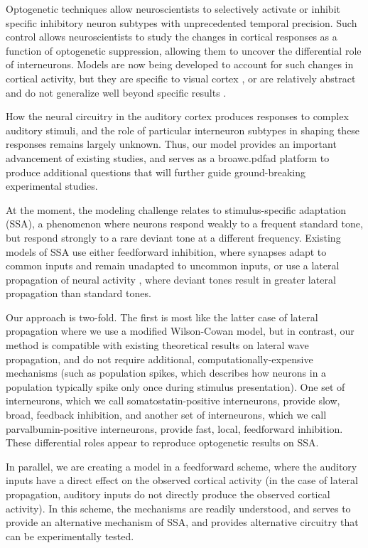 \documentclass[a4paper,11pt]{article}
\begin{document}
Optogenetic techniques allow neuroscientists to selectively activate or inhibit specific inhibitory neuron subtypes with unprecedented temporal precision. Such control allows neuroscientists to study the changes in cortical responses as a function of optogenetic suppression, allowing them to uncover the differential role of interneurons. Models are now being developed to account for such changes in cortical activity, but they are specific to visual cortex \cite{litwin2016inhibitory}, or are relatively abstract and do not generalize well beyond specific results \cite{seybold2015inhibitory,phillips2016asymmetric,phillips2017cortical}.

How the neural circuitry in the auditory cortex produces responses to complex auditory stimuli, and the role of particular interneuron subtypes in shaping these responses remains largely unknown. Thus, our model provides an important advancement of existing studies, and serves as a broawc.pdfad platform to produce additional questions that will further guide ground-breaking experimental studies.

At the moment, the modeling challenge relates to stimulus-specific adaptation (SSA), a phenomenon where neurons respond weakly to a frequent standard tone, but respond strongly to a rare deviant tone at a different frequency. Existing models of SSA use either feedforward inhibition, where synapses adapt to common inputs and remain unadapted to uncommon inputs\cite{mill2011neurocomputational}, or use a lateral propagation of neural activity \cite{yarden2017stimulus}, where deviant tones result in greater lateral propagation than standard tones.

Our approach is two-fold. The first is most like the latter case of lateral propagation where we use a modified Wilson-Cowan model, but in contrast, our method is compatible with existing theoretical results on lateral wave propagation, and do not require additional, computationally-expensive mechanisms (such as population spikes, which describes how neurons in a population typically spike only once during stimulus presentation). One set of interneurons, which we call somatostatin-positive interneurons, provide slow, broad, feedback inhibition, and another set of interneurons, which we call parvalbumin-positive interneurons, provide fast, local, feedforward inhibition. These differential roles appear to reproduce optogenetic results on SSA.

In parallel, we are creating a model in a feedforward scheme, where the auditory inputs have a direct effect on the observed cortical activity (in the case of lateral propagation, auditory inputs do not directly produce the observed cortical activity). In this scheme, the mechanisms are readily understood, and serves to provide an alternative mechanism of SSA, and provides alternative circuitry that can be experimentally tested.
\end{document}
